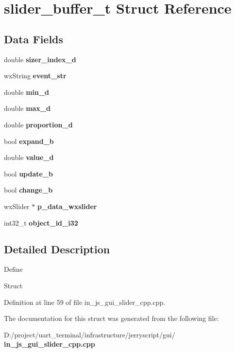 \section{slider\+\_\+buffer\+\_\+t Struct Reference}
\label{structslider__buffer__t}
\subsection*{Data Fields}
\begin{DoxyCompactItemize}
\item 
\mbox{\label{structslider__buffer__t_aae99f717aadbf88f890c71a293468af8}} 
double {\bfseries sizer\+\_\+index\+\_\+d}
\item 
\mbox{\label{structslider__buffer__t_a43aba9d4f0f518678c2dd03b5bfd9e7e}} 
wx\+String {\bfseries event\+\_\+str}
\item 
\mbox{\label{structslider__buffer__t_aa227f41b50c9f8c62a10df5d4e66fe6b}} 
double {\bfseries min\+\_\+d}
\item 
\mbox{\label{structslider__buffer__t_ab0bacd01a71d4a464694866fb1502a4b}} 
double {\bfseries max\+\_\+d}
\item 
\mbox{\label{structslider__buffer__t_a93e3ac3895fbb25863fb66af78e0ed39}} 
double {\bfseries proportion\+\_\+d}
\item 
\mbox{\label{structslider__buffer__t_a53aa234b863a2576e80b08f9dab88ca3}} 
bool {\bfseries expand\+\_\+b}
\item 
\mbox{\label{structslider__buffer__t_a5a05b112887b06e0421e4950b7e0e2fe}} 
double {\bfseries value\+\_\+d}
\item 
\mbox{\label{structslider__buffer__t_a4aed9ad79f44786d35de6f7804904494}} 
bool {\bfseries update\+\_\+b}
\item 
\mbox{\label{structslider__buffer__t_a70eabe6f222b798dfe3e510777055022}} 
bool {\bfseries change\+\_\+b}
\item 
\mbox{\label{structslider__buffer__t_ac57eb2e9448ce18e28297277ce42624c}} 
wx\+Slider $\ast$ {\bfseries p\+\_\+data\+\_\+wxslider}
\item 
\mbox{\label{structslider__buffer__t_aa7683407966206b7eb17d410ee75d880}} 
int32\+\_\+t {\bfseries object\+\_\+id\+\_\+i32}
\end{DoxyCompactItemize}


\subsection{Detailed Description}
Define

Struct 

Definition at line 59 of file in\+\_\+js\+\_\+gui\+\_\+slider\+\_\+cpp.\+cpp.



The documentation for this struct was generated from the following file\+:\begin{DoxyCompactItemize}
\item 
D\+:/project/uart\+\_\+terminal/infrastructure/jerryscript/gui/\textbf{ in\+\_\+js\+\_\+gui\+\_\+slider\+\_\+cpp.\+cpp}\end{DoxyCompactItemize}
